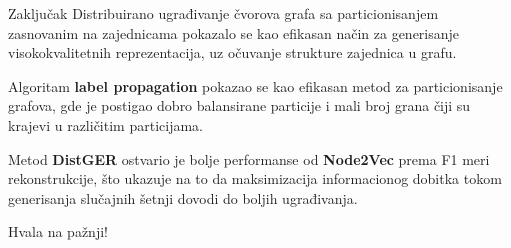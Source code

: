 \documentclass{beamer}
\begin{document}
\begin{frame}{Zaključak}
Distribuirano ugrađivanje čvorova grafa sa particionisanjem zasnovanim na zajednicama pokazalo se kao efikasan način za generisanje visokokvalitetnih reprezentacija, uz očuvanje strukture zajednica u grafu.

\vspace{0.3cm}

Algoritam \textbf{label propagation} pokazao se kao efikasan metod za particionisanje grafova, gde je postigao dobro balansirane particije i mali broj grana čiji su krajevi u različitim particijama.

\vspace{0.3cm}

Metod \textbf{DistGER} ostvario je bolje performanse od \textbf{Node2Vec} prema F1 meri rekonstrukcije, što ukazuje na to da maksimizacija informacionog dobitka tokom generisanja slučajnih šetnji dovodi do boljih ugrađivanja.
\end{frame}




\begin{frame}
	\begin{center}
		\Huge Hvala na pažnji!
	\end{center}
\end{frame}
\end{document}
